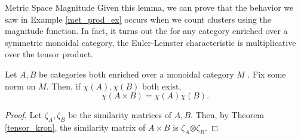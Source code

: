 \documentclass[12pt]{pom_thesis}
\newcommand{\kron}{\boldsymbol{\otimes}}
\begin{document}
\begin{chapter}{Metric Space Magnitude}
Given this lemma, we can prove that the behavior we saw in Example \ref{met_prod_ex} occurs when we count clusters using the magnitude function. In fact, it turns out the for any category enriched over a symmetric monoidal category, the Euler-Leinster characteristic is multiplicative over the tensor product. 

\begin{thm}
Let $A, B$ be categories both enriched over a monoidal category $M$ . Fix some norm on $M$. Then, if $\chi(A), \chi(B)$ both exist,
\[
\chi(A \times B) = \chi(A)\chi(B).
\]
\end{thm}
\begin{proof}
Let $\zeta_A, \zeta_B$ be the similarity matrices of $A,B$. Then, by Theorem \ref{tensor_kron}, the similarity matrix of $A \times B$ is $\zeta_A \kron \zeta_B$. 


\end{proof}
\end{chapter}
\end{document}
